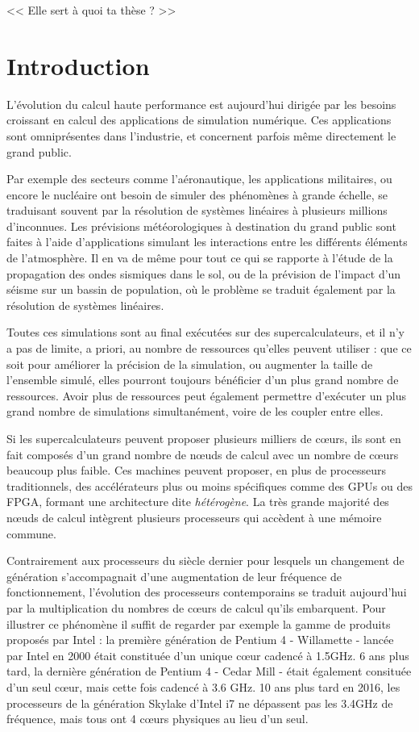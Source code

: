 \begin{savequote}[6cm]
<< Elle sert à quoi ta thèse ?  >>

\end{savequote}
\chapter{Introduction}
\chaptertoc

L'évolution du calcul haute performance est aujourd'hui dirigée par les besoins croissant en calcul des applications de simulation numérique.
Ces applications sont omniprésentes dans l'industrie, et concernent parfois même directement le grand public.

Par exemple des secteurs comme l'aéronautique, les applications militaires, ou encore le nucléaire ont besoin de simuler des phénomènes à grande échelle, se traduisant souvent par la résolution de systèmes linéaires à plusieurs millions d'inconnues.
Les prévisions météorologiques à destination du grand public sont faites à l'aide d'applications simulant les interactions entre les différents éléments de l'atmosphère.
Il en va de même pour tout ce qui se rapporte à l'étude de la propagation des ondes sismiques dans le sol, ou de la prévision de l'impact d'un séisme sur un bassin de population, où le problème se traduit également par la résolution de systèmes linéaires.

Toutes ces simulations sont au final exécutées sur des supercalculateurs, et il n'y a pas de limite, a priori, au nombre de ressources qu'elles peuvent utiliser : que ce soit pour améliorer la précision de la simulation, ou augmenter la taille de l'ensemble simulé, elles pourront toujours bénéficier d'un plus grand nombre de ressources.
Avoir plus de ressources peut également permettre d'exécuter un plus grand nombre de simulations simultanément, voire de les coupler entre elles.

Si les supercalculateurs peuvent proposer plusieurs milliers de cœurs, ils sont en fait composés d'un grand nombre de nœuds de calcul avec un nombre de cœurs beaucoup plus faible.
Ces machines peuvent proposer, en plus de processeurs traditionnels, des accélérateurs plus ou moins spécifiques comme des GPUs ou des FPGA, formant une architecture dite \emph{hétérogène}.
La très grande majorité des nœuds de calcul intègrent plusieurs processeurs qui accèdent à une mémoire commune.

Contrairement aux processeurs du siècle dernier pour lesquels un changement de génération s'accompagnait d'une augmentation de leur fréquence de fonctionnement, l'évolution des processeurs contemporains se traduit aujourd'hui par la multiplication du nombres de cœurs de calcul qu'ils embarquent.
Pour illustrer ce phénomène il suffit de regarder par exemple la gamme de produits proposés par Intel : la première génération de Pentium 4 - Willamette - lancée par Intel en 2000 était constituée d'un unique cœur cadencé à 1.5GHz. 6 ans plus tard, la dernière génération de Pentium 4 - Cedar Mill - était également consituée d'un seul cœur, mais cette fois cadencé à 3.6 GHz. 10 ans plus tard en 2016, les processeurs de la génération Skylake d'Intel i7 ne dépassent pas les 3.4GHz de fréquence, mais tous ont 4 cœurs physiques au lieu d'un seul.

